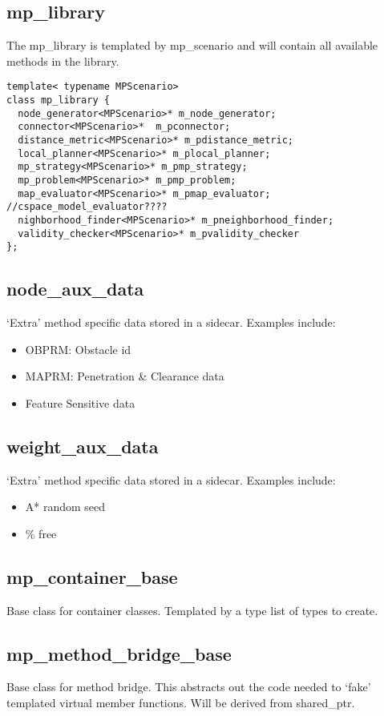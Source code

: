 \subsection{mp\_library}
The mp\_library is templated by mp\_scenario and will contain all 
available methods in the library.  

\begin{lstlisting}
template< typename MPScenario>
class mp_library {
  node_generator<MPScenario>* m_node_generator;
  connector<MPScenario>*  m_pconnector;
  distance_metric<MPScenario>* m_pdistance_metric;
  local_planner<MPScenario>* m_plocal_planner;
  mp_strategy<MPScenario>* m_pmp_strategy;
  mp_problem<MPScenario>* m_pmp_problem;
  map_evaluator<MPScenario>* m_pmap_evaluator; //cspace_model_evaluator????
  nighborhood_finder<MPScenario>* m_pneighborhood_finder;
  validity_checker<MPScenario>* m_pvalidity_checker
};
\end{lstlisting}

\subsection{node\_aux\_data}
`Extra' method specific data stored in a sidecar.  Examples include:
\begin{itemize}
\item OBPRM: Obstacle id
\item MAPRM: Penetration \& Clearance data
\item Feature Sensitive data
\end{itemize}

\subsection{weight\_aux\_data}
`Extra' method specific data stored in a sidecar.  Examples include:
\begin{itemize}
\item A* random seed
\item \% free
\end{itemize}

\subsection{mp\_container\_base} 
Base class for container classes.  Templated by a type list of types to create.

\subsection{mp\_method\_bridge\_base}
Base class for method bridge.  This abstracts out the code needed to `fake' 
templated virtual member functions.  Will be derived from shared\_ptr.

